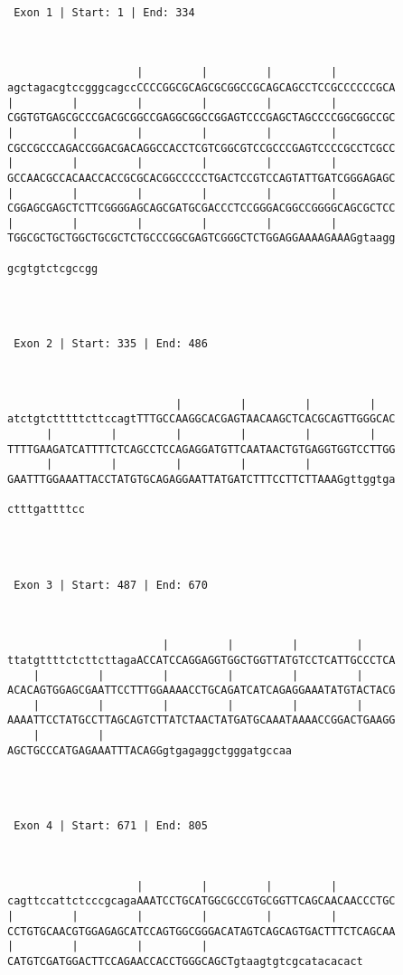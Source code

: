 \documentclass{article}
\begin{document}
\begin{Verbatim}




 Exon 1 | Start: 1 | End: 334 



                    |         |         |         |         
agctagacgtccgggcagccCCCCGGCGCAGCGCGGCCGCAGCAGCCTCCGCCCCCCGCA
|         |         |         |         |         |         
CGGTGTGAGCGCCCGACGCGGCCGAGGCGGCCGGAGTCCCGAGCTAGCCCCGGCGGCCGC
|         |         |         |         |         |         
CGCCGCCCAGACCGGACGACAGGCCACCTCGTCGGCGTCCGCCCGAGTCCCCGCCTCGCC
|         |         |         |         |         |         
GCCAACGCCACAACCACCGCGCACGGCCCCCTGACTCCGTCCAGTATTGATCGGGAGAGC
|         |         |         |         |         |         
CGGAGCGAGCTCTTCGGGGAGCAGCGATGCGACCCTCCGGGACGGCCGGGGCAGCGCTCC
|         |         |         |         |         |         
TGGCGCTGCTGGCTGCGCTCTGCCCGGCGAGTCGGGCTCTGGAGGAAAAGAAAGgtaagg
              
gcgtgtctcgccgg




 Exon 2 | Start: 335 | End: 486 



                          |         |         |         |   
atctgtctttttcttccagtTTTGCCAAGGCACGAGTAACAAGCTCACGCAGTTGGGCAC
      |         |         |         |         |         |   
TTTTGAAGATCATTTTCTCAGCCTCCAGAGGATGTTCAATAACTGTGAGGTGGTCCTTGG
      |         |         |         |         |             
GAATTTGGAAATTACCTATGTGCAGAGGAATTATGATCTTTCCTTCTTAAAGgttggtga
            
ctttgattttcc




 Exon 3 | Start: 487 | End: 670 



                        |         |         |         |     
ttatgttttctcttcttagaACCATCCAGGAGGTGGCTGGTTATGTCCTCATTGCCCTCA
    |         |         |         |         |         |     
ACACAGTGGAGCGAATTCCTTTGGAAAACCTGCAGATCATCAGAGGAAATATGTACTACG
    |         |         |         |         |         |     
AAAATTCCTATGCCTTAGCAGTCTTATCTAACTATGATGCAAATAAAACCGGACTGAAGG
    |         |                             
AGCTGCCCATGAGAAATTTACAGGgtgagaggctgggatgccaa




 Exon 4 | Start: 671 | End: 805 



                    |         |         |         |         
cagttccattctcccgcagaAAATCCTGCATGGCGCCGTGCGGTTCAGCAACAACCCTGC
|         |         |         |         |         |         
CCTGTGCAACGTGGAGAGCATCCAGTGGCGGGACATAGTCAGCAGTGACTTTCTCAGCAA
|         |         |         |                        
CATGTCGATGGACTTCCAGAACCACCTGGGCAGCTgtaagtgtcgcatacacact





\end{Verbatim}
\end{document}
